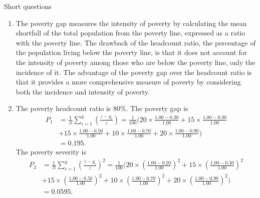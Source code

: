\begin{homeworkProblem}{Short questions}
\begin{solution}
        \begin{enumerate}
            \item The poverty gap measures the intensity of poverty by 
                calculating the mean shortfall of the total population from 
                the poverty line, expressed as a ratio with the poverty line. 
                The drawback of the headcount ratio, the percentage of the 
                population living below the poverty line, is that it does not 
                account for the intensity of poverty among those who are below 
                the poverty line, only the incidence of it. The advantage of 
                the poverty gap over the headcount ratio is that it provides 
                a more comprehensive measure of poverty by considering both 
                the incidence and intensity of poverty.
            \item The poverty headcount ratio is 80\%. The poverty gap is 
                \[
                    \begin{aligned}
                        P_1 &= \frac{1}{N} \sum_{i=1}^{q} \left( 
                            \frac{z - y_i}{z} \right) = \frac{1}{100} \Bigg(
                            20 \times \frac{1.00 - 0.20}{1.00} + 15 \times 
                            \frac{1.00 - 0.30}{1.00} \\
                            &+ 15 \times \frac{1.00 - 0.50}{1.00} + 10 \times 
                            \frac{1.00 - 0.70}{1.00} + 20 
                            \times \frac{1.00 - 0.90}{1.00} \Bigg) \\
                            &= 0.195.
                    \end{aligned}
                \]
                The poverty severity is 
                \[
                    \begin{aligned}
                        P_2 &= \frac{1}{N} \sum_{i=1}^{q} \left( 
                            \frac{z - y_i}{z} \right)^2 = \frac{1}{100} \Bigg(
                            20 \times \left( \frac{1.00 - 0.20}{1.00} \right)^2
                            + 15 \times \left( \frac{1.00 - 0.30}{1.00} \right)^2 \\
                            &+ 15 \times \left( \frac{1.00 - 0.50}{1.00} \right)^2
                            + 10 \times \left( \frac{1.00 - 0.70}{1.00} \right)^2
                            + 20 \times \left( \frac{1.00 - 0.90}{1.00} \right)^2
                        \Bigg) \\
                        &= 0.0595.

\end{aligned}\]
\end{enumerate}
\end{solution}
\end{homeworkProblem}
